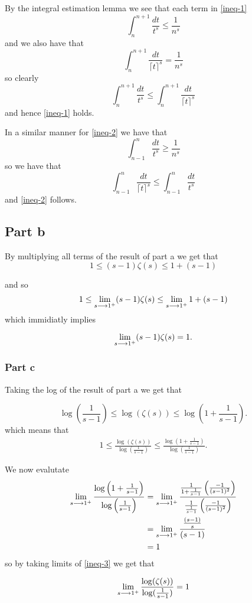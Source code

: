 \documentclass{unswmaths}
\begin{document}
By the integral estimation lemma we see that each term in \eqref{ineq-1}
$$
	\int_{n}^{n+1} \frac{dt}{t^s} \leq \frac{1}{n^s}
$$
and we also have that
$$
	\int_{n}^{n+1} \frac{dt}{\lceil t \rceil^s} = \frac{1}{n^s}
$$
so clearly 
$$
	\int_{n}^{n+1} \frac{dt}{t^s} \leq \int_{n}^{n+1} \frac{dt}{\lceil t \rceil^s}
$$
and hence \eqref{ineq-1} holds.

In a similar manner for \eqref{ineq-2} we have that 
$$
	\int_{n-1}^n \frac{dt}{t^s} \geq \frac{1}{n^s}
$$
so we have that
$$
	\int_{n-1}^{n} \frac{dt}{\lceil t \rceil^s} \leq \int_{n-1}^n \frac{dt}{t^s}
$$
and \eqref{ineq-2} follows.

\subsection*{Part b}

By multiplying all terms of the result of part a we get that
$$
	1 \leq (s-1)\zeta(s) \leq 1 + (s-1)
$$

and so
$$
	1 \leq \lim_{s \longrightarrow 1^+} (s-1)\zeta(s) \leq \lim_{s\longrightarrow 1^+} 1 + (s-1)
$$
which immidiatly implies

$$
	\lim_{s \longrightarrow 1^+} (s-1) \zeta(s) = 1.
$$

\subsubsection*{Part c}

Taking the log of the result of part a we get that

$$
	\log(\frac{1}{s-1}) \leq \log(\zeta(s)) \leq \log(1 + \frac{1}{s-1}).
$$
which means that
\begin{align}
	\label{ineq-3}
	1 \leq \frac{\log(\zeta(s))}{\log\left( \frac{1}{s-1}\right)} \leq \frac{\log \left( 1 + \frac{1}{s-1} \right)}{\log\left( \frac{1}{s-1}\right)}.
\end{align}

We now evalutate
\begin{align*}
	\lim_{s \longrightarrow 1^+} \frac{\log \left( 1 + \frac{1}{s-1} \right)}{\log\left( \frac{1}{s-1}\right)} &= \lim_{s \longrightarrow 1^+}\frac{\frac{1}{1+\frac{1}{s-1}}\left( \frac{-1}{(s-1)^2}\right)}{\frac{1}{\frac{1}{s-1}}\left( \frac{-1}{(s-1)^2}\right)} \\
		&= \lim_{s \longrightarrow 1^+} \frac{\frac{(s-1)}{s}}{(s-1)} \\
		&= 1
\end{align*}
so by taking limits of \eqref{ineq-3} we get that 

$$
	\lim_{s \longrightarrow 1^+} \frac{\log(\zeta(s))}{\log(\frac{1}{s-1})} = 1
$$
\end{document}
